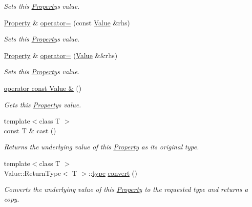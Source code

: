 \begin{DoxyCompactItemize}
\begin{DoxyCompactList}\small\item\em Sets this \hyperlink{classdg_1_1deepcore_1_1_property}{Property}\textquotesingle{}s value. \end{DoxyCompactList}\item 
\hyperlink{classdg_1_1deepcore_1_1_property}{Property} \& \hyperlink{classdg_1_1deepcore_1_1_property_a9b79ce751bfdcef3527aa378c2eacae9}{operator=} (const \hyperlink{classdg_1_1deepcore_1_1_value}{Value} \&rhs)
\begin{DoxyCompactList}\small\item\em Sets this \hyperlink{classdg_1_1deepcore_1_1_property}{Property}\textquotesingle{}s value. \end{DoxyCompactList}\item 
\hyperlink{classdg_1_1deepcore_1_1_property}{Property} \& \hyperlink{classdg_1_1deepcore_1_1_property_acfdbdc1a8f32447e029933f6f433963f}{operator=} (\hyperlink{classdg_1_1deepcore_1_1_value}{Value} \&\&rhs)
\begin{DoxyCompactList}\small\item\em Sets this \hyperlink{classdg_1_1deepcore_1_1_property}{Property}\textquotesingle{}s value. \end{DoxyCompactList}\item 
\hyperlink{classdg_1_1deepcore_1_1_property_ae25613a40e8082d24023dd10ca16b11f}{operator const Value \&} ()
\begin{DoxyCompactList}\small\item\em Gets this \hyperlink{classdg_1_1deepcore_1_1_property}{Property}\textquotesingle{}s value. \end{DoxyCompactList}\item 
{\footnotesize template$<$class T $>$ }\\const T \& \hyperlink{classdg_1_1deepcore_1_1_property_a519536a488a5406928ea976921b2f6aa}{cast} ()
\begin{DoxyCompactList}\small\item\em Returns the underlying value of this \hyperlink{classdg_1_1deepcore_1_1_property}{Property} as its original type. \end{DoxyCompactList}\item 
{\footnotesize template$<$class T $>$ }\\Value\+::\+Return\+Type$<$ T $>$\+::\hyperlink{classdg_1_1deepcore_1_1_object_a80356589437cb086680c6b5fbd8044d4}{type} \hyperlink{classdg_1_1deepcore_1_1_property_a9c43ca7f86d7b3d37552b58e9ba9f656}{convert} ()
\begin{DoxyCompactList}\small\item\em Converts the underlying value of this \hyperlink{classdg_1_1deepcore_1_1_property}{Property} to the requested type and returns a copy. \end{DoxyCompactList}\end{DoxyCompactItemize}
